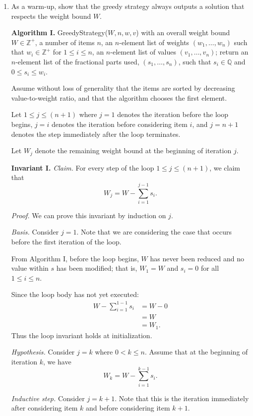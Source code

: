 \begin{enumerate}
    \item As a warm-up, show that the greedy strategy always outputs a solution that respects the weight bound $W$.
\begin{solution}

\textbf{Algorithm I. }{\sc GreedyStrategy($W,n,w,v$)} with an overall weight bound $W\in\mathbb{Z}^+$, a number of items $n$, an $n$-element list of weights $(w_1,\dots,w_n)$ such that $w_i\in\mathbb{Z}^+$ for $1\leq i\leq n$, an $n$-element list of values $(v_1,\dots,v_n)$; return an $n$-element list of the fractional parts used, $(s_1,\dots,s_n)$, such that $s_i\in\mathbb{Q}$ and $0\leq s_i\leq w_i$. 

Assume without loss of generality that the items are sorted by decreasing value-to-weight ratio, and that the algorithm chooses the first element.

Let $1\leq j\leq(n+1)$ where $j=1$ denotes the iteration before the loop begins, $j=i$ denotes the iteration before considering item $i$, and $j=n+1$ denotes the step immediately after the loop terminates.

Let $W_j$ denote the remaining weight bound at the beginning of iteration $j$. 

\textbf{Invariant I. }\textit{Claim. }
For every step of the loop $1\leq j\leq(n+1)$, we claim that \[W_j=W-\sum_{i=1}^{j-1}{s_i}.\] 

\textit{Proof. }We can prove this invariant by induction on $j$.

\textit{Basis. }Consider $j=1$. Note that we are considering the case that occurs before the first iteration of the loop. 

From Algorithm I, before the loop begins, $W$ has never been reduced and no value within $s$ has been modified; that is, $W_1=W$ and $s_i=0$ for all $1\leq i\leq n$.

Since the loop body has not yet executed:
\begin{align*}
W-\sum_{i=1}^{1-1}{s_i}&=W-0\\
&=W\\
&=W_1.
\end{align*}
Thus the loop invariant holds at initialization.

\textit{Hypothesis. }Consider $j=k$ where $0<k\leq n$. Assume that at the beginning of iteration $k$, we have \[W_k=W-\sum_{i=1}^{k-1}s_i.\]

\textit{Inductive step. }Consider $j=k+1$. Note that this is the iteration immediately after considering item $k$ and before considering item $k+1$. 


\end{solution}
\end{enumerate}
